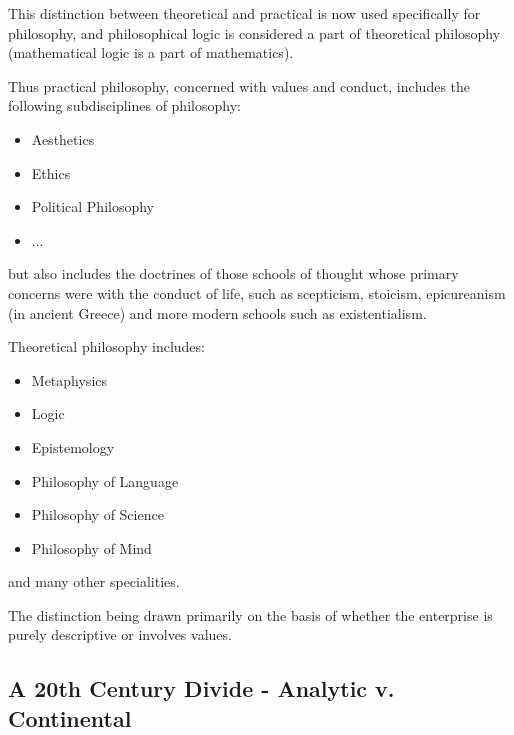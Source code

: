 \documentclass[10pt,titlepage]{article}
\newcommand{\ignore}[1]{}
\begin{document}
This distinction between theoretical and practical is now used specifically for philosophy, and philosophical logic is considered a part of theoretical philosophy (mathematical logic is a part of mathematics).

Thus practical philosophy, concerned with values and conduct, includes the following subdisciplines of philosophy:

\begin{itemize}
\item Aesthetics
\item Ethics
\item Political Philosophy
\item ...
\end{itemize}

but also includes the doctrines of those schools of thought whose primary concerns were with the conduct of life, such as scepticism, stoicism, epicureanism (in ancient Greece) and more modern schools such as existentialism.

Theoretical philosophy includes:

\begin{itemize}
\item Metaphysics
\item Logic
\item Epistemology
\item Philosophy of Language
\item Philosophy of Science
\item Philosophy of Mind
\end{itemize}

and many other specialities.

The distinction being drawn primarily on the basis of whether the enterprise is purely descriptive or involves values.

\ignore{
\subsection{Rationalism and Empiricism}

In the early modern period of philosophy certain philosophers have been 

\subsection{Hume's Forks}

There is 
}%

\subsection{A 20th Century Divide - Analytic v. Continental}
\end{document}

